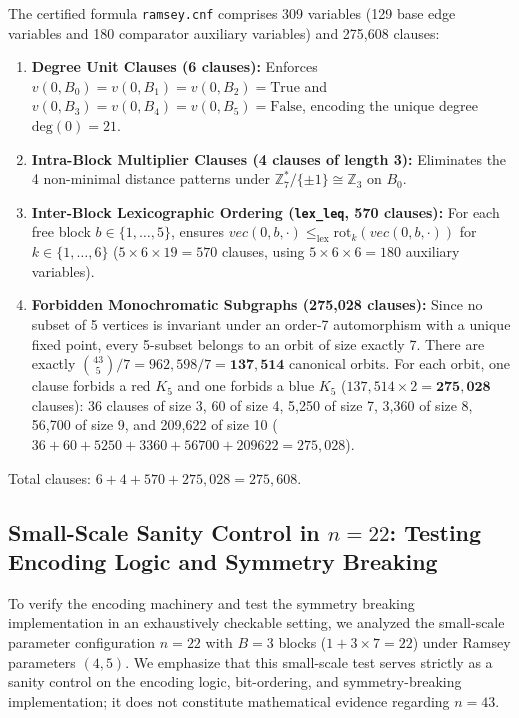\documentclass[11pt,a4paper]{article}
\theoremstyle{definition}
\begin{document}
The certified formula \texttt{ramsey.cnf} comprises 309 variables (129 base edge variables and 180 comparator auxiliary variables) and 275,608 clauses:
\begin{enumerate}
    \item \textbf{Degree Unit Clauses (6 clauses):} Enforces $v(0, B_0) = v(0, B_1) = v(0, B_2) = \text{True}$ and $v(0, B_3) = v(0, B_4) = v(0, B_5) = \text{False}$, encoding the unique degree $\text{deg}(0) = 21$.
    \item \textbf{Intra-Block Multiplier Clauses (4 clauses of length 3):} Eliminates the 4 non-minimal distance patterns under $\mathbb{Z}_7^* / \{\pm 1\} \cong \mathbb{Z}_3$ on $B_0$.
    \item \textbf{Inter-Block Lexicographic Ordering (\texttt{lex\_leq}, 570 clauses):} For each free block $b \in \{1, \dots, 5\}$, ensures $vec(0, b, \cdot) \le_{\text{lex}} \text{rot}_k(vec(0, b, \cdot))$ for $k \in \{1, \dots, 6\}$ ($5 \times 6 \times 19 = 570$ clauses, using $5 \times 6 \times 6 = 180$ auxiliary variables).
    \item \textbf{Forbidden Monochromatic Subgraphs (275,028 clauses):} Since no subset of 5 vertices is invariant under an order-7 automorphism with a unique fixed point, every 5-subset belongs to an orbit of size exactly 7. There are exactly $\binom{43}{5} / 7 = 962,598 / 7 = \mathbf{137,514}$ canonical orbits. For each orbit, one clause forbids a red $K_5$ and one forbids a blue $K_5$ ($137,514 \times 2 = \mathbf{275,028}$ clauses): 36 clauses of size 3, 60 of size 4, 5,250 of size 7, 3,360 of size 8, 56,700 of size 9, and 209,622 of size 10 ($36 + 60 + 5250 + 3360 + 56700 + 209622 = 275,028$).
\end{enumerate}
Total clauses: $6 + 4 + 570 + 275,028 = 275,608$.

\subsection{Small-Scale Sanity Control in \texorpdfstring{$n=22$}{n=22}: Testing Encoding Logic and Symmetry Breaking}

To verify the encoding machinery and test the symmetry breaking implementation in an exhaustively checkable setting, we analyzed the small-scale parameter configuration $n=22$ with $B=3$ blocks ($1 + 3 \times 7 = 22$) under Ramsey parameters $(4,5)$. We emphasize that this small-scale test serves strictly as a sanity control on the encoding logic, bit-ordering, and symmetry-breaking implementation; it does not constitute mathematical evidence regarding $n=43$.
\end{document}
